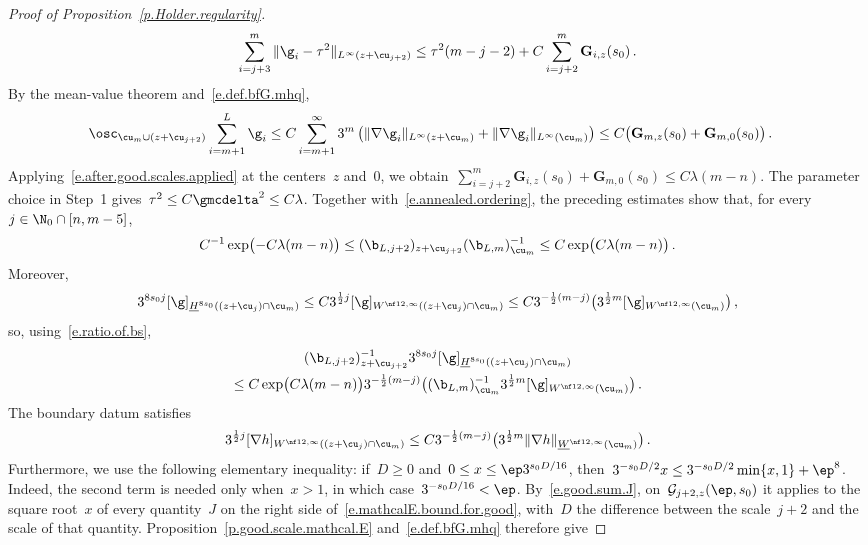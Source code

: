 \documentclass[11pt]{amsart}
\begin{document}
\begin{proof}[{Proof of Proposition~\ref{p.Holder.regularity}}]
\begin{equation*}
	\sum_{i=j+3}^m\|\g_i-\tau^2\|_{L^\infty(z+\cu_{j+2})}
	\leq \tau^2(m-j-2)+C\sum_{i=j+2}^m\mathbf G_{i,z}(s_0)\,.
\end{equation*}
By the mean-value theorem and~\eqref{e.def.bfG.mhq},
\begin{align*}
	\osc_{\cu_m\cup(z+\cu_{j+2})}\sum_{i=m+1}^L\g_i
	&\leq C\sum_{i=m+1}^\infty 3^m
	\left(
	\|\nabla\g_i\|_{L^\infty(z+\cu_m)}
	+\|\nabla\g_i\|_{L^\infty(\cu_m)}
	\right)
	\leq C\bigl(\mathbf G_{m,z}(s_0)+\mathbf G_{m,0}(s_0)\bigr)\,.
\end{align*}
Applying~\eqref{e.after.good.scales.applied} at the centers~$z$ and~$0$, we obtain~$\sum_{i=j+2}^m\mathbf G_{i,z}(s_0)+\mathbf G_{m,0}(s_0)\leq C\lambda(m-n)$. The parameter choice in Step~1 gives~$\tau^2\leq C\gmcdelta^2\leq C\lambda$. Together with~\eqref{e.annealed.ordering}, the preceding estimates show that, for every~$j\in\N_0\cap[n,m-5]$,
\begin{equation}
	C^{-1}\exp\bigl(-C\lambda(m-n)\bigr)
	\leq (\b_{L,j+2})_{z+\cu_{j+2}}(\b_{L,m})_{\cu_m}^{-1}
	\leq C\exp\bigl(C\lambda(m-n)\bigr)\,.
	\label{e.ratio.of.bs}
\end{equation}
Moreover,
\begin{equation*}
	3^{8s_0 j}[\g]_{\underline{H}^{8s_0}((z+\cu_{j})\cap\cu_m)}
	\leq C3^{\frac{1}{2} j}[\g]_{W^{\nf12,\infty}((z+\cu_{j})\cap\cu_m)}
	\leq C3^{-\frac{1}{2}(m-j)}\bigl(3^{\frac{1}{2} m}[\g]_{W^{\nf12,\infty}(\cu_m)}\bigr)\,,
\end{equation*}
so, using~\eqref{e.ratio.of.bs},
\begin{multline}
	(\b_{L,j+2})_{z+\cu_{j+2}}^{-1} 3^{8s_0 j}[\g]_{\underline{H}^{8s_0}((z+\cu_{j})\cap\cu_m)}
	\\
	\leq C\exp\bigl(C\lambda(m-n)\bigr) 3^{-\frac{1}{2}(m-j)}
	\bigl((\b_{L,m})_{\cu_m}^{-1} 3^{\frac{1}{2} m}[\g]_{W^{\nf12,\infty}(\cu_m)}\bigr)\,.
	\label{e.forcing.j.bound}
\end{multline}
The boundary datum satisfies
\begin{equation}
	3^{\frac{1}{2} j}[\nabla h]_{W^{\nf12,\infty}((z+\cu_{j})\cap\cu_m)}
	\leq C3^{-\frac{1}{2}(m-j)}\bigl(3^{\frac{1}{2} m}\|\nabla h\|_{\underline{W}^{\nf12,\infty}(\cu_m)}\bigr)\,.
	\label{e.boundary.j.bound}
\end{equation}
Furthermore, we use the following elementary inequality: if~$D\geq0$ and~$0\leq x\leq\ep 3^{s_0D/16}$, then~$3^{-s_0D/2}x\leq 3^{-s_0D/2}\min\{x,1\}+\ep^8$. Indeed, the second term is needed only when~$x>1$, in which case~$3^{-s_0D/16}<\ep$. By~\eqref{e.good.sum.J}, on~$\mathcal G_{j+2,z}(\ep,s_0)$ it applies to the square root~$x$ of every quantity~$J$ on the right side of~\eqref{e.mathcalE.bound.for.good}, with~$D$ the difference between the scale~$j+2$ and the scale of that quantity.  Proposition~\ref{p.good.scale.mathcal.E} and~\eqref{e.def.bfG.mhq} therefore give

\end{proof}
\end{document}
